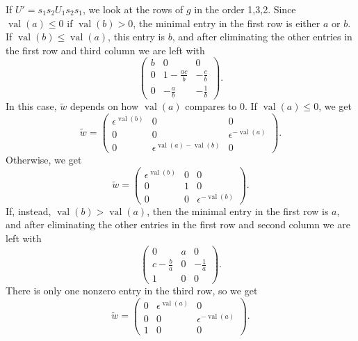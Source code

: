 \documentclass{amsart}
\theoremstyle{definition}
\def\e{\epsilon}
\def\w{\widetilde{w}}
\def\val{\mathop{\mathrm{val}}}
\begin{document}
  If $U' = s_1s_2 U_1 s_2s_1$, we look at the rows of $g$ in the order 1,3,2.
  Since $\val(a) \le 0$ if $\val(b) > 0$, the minimal entry in the first row is
  either $a$ or $b$.  If $\val(b) \le \val(a)$, this entry is $b$, and after
  eliminating the other entries in the first row and third column we are left
  with
  \begin{equation}\label{eq:w4-row1-b-le-a}
    \begin{pmatrix}
      b & 0 & 0 \\
      0 & 1 - \frac{ac}{b} & -\frac{c}{b}  \\
      0 & -\frac{a}{b} & -\frac{1}{b}
    \end{pmatrix}.
  \end{equation}
  In this case, $\w$ depends on how $\val(a)$ compares to 0.  If $\val(a) \le
  0$, we get
    \begin{equation*}\w = \begin{pmatrix}
      \e^{\val(b)} & 0 &  0\\
      0 & 0 & \e^{-\val(a)}  \\
      0 & \e^{\val(a) - \val(b)} & 0  
    \end{pmatrix}.
  \end{equation*}
  Otherwise, we get 
  \begin{equation*}\w = \begin{pmatrix}
      \e^{\val(b)} & 0 &  0\\
      0 & 1 & 0 \\
      0 & 0 & \e^{-\val(b)} 
    \end{pmatrix}.
  \end{equation*}
  If, instead, $\val(b) > \val(a)$, then the minimal entry in the first row is
  $a$, and after eliminating the other entries in the first row and second
  column we are left with
  \begin{equation}\label{eq:w4-row1-b-g-a}
    \begin{pmatrix}
      0 & a & 0 \\
      c - \frac{b}{a} & 0 & -\frac{1}{a} \\
      1 & 0 & 0
    \end{pmatrix}.
  \end{equation}
  There is only one nonzero entry in the third row, so we get
  \begin{equation*}
    \w = \begin{pmatrix}
      0 & \e^{\val(a)} & 0 \\
      0 & 0 & \e^{-\val(a)} \\
      1 & 0 & 0
    \end{pmatrix}.
  \end{equation*}
\end{document}
